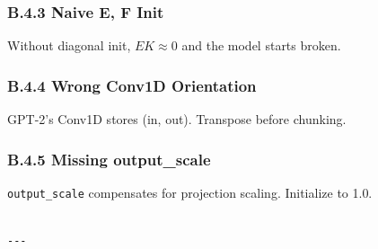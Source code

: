 \subsubsection{B.4.3 Naive E, F Init}

Without diagonal init, $E K \approx 0$ and the model starts broken.

\subsubsection{B.4.4 Wrong Conv1D Orientation}

GPT-2's Conv1D stores (in, out). Transpose before chunking.

\subsubsection{B.4.5 Missing output\_scale}

\texttt{output\_scale} compensates for projection scaling. Initialize to 1.0.
\begin{lstlisting}

---
\end{lstlisting}